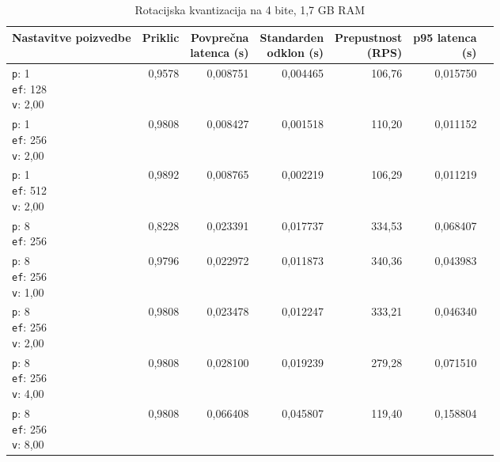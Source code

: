 \begin{table}[htbp]
  \centering
\small
  \caption{Rotacijska kvantizacija na 4 bite, 1,7 GB RAM}
  \label{tab:single-2cpu-1.7ram:tq4:qdrant-dipl-baseline-tenant-subgraph-tq4-ext-m16-ef-128-random-768-100-tenants-extended-upload-2026-08-18-13-03-21.json}
  \begin{tabularx}{\textwidth}{Xrrrrrr}
    \toprule
    Nastavitve poizvedbe & Priklic & \makecell{Povprečna\\latenca (s)} & \makecell{Standarden\\odklon (s)} & \makecell{Prepustnost\\(RPS)} & \makecell{p95 latenca\\(s)}  \\
    \midrule
    \makecell{\texttt{p}: 1\\\texttt{ef}: 128\\\texttt{v}: 2,00} & 0,9578 & 0,008751 & 0,004465 & 106,76 & 0,015750 \\
    \makecell{\texttt{p}: 1\\\texttt{ef}: 256\\\texttt{v}: 2,00} & 0,9808 & 0,008427 & 0,001518 & 110,20 & 0,011152 \\
    \makecell{\texttt{p}: 1\\\texttt{ef}: 512\\\texttt{v}: 2,00} & 0,9892 & 0,008765 & 0,002219 & 106,29 & 0,011219 \\
    \makecell{\texttt{p}: 8\\\texttt{ef}: 256} & 0,8228 & 0,023391 & 0,017737 & 334,53 & 0,068407 \\
    \makecell{\texttt{p}: 8\\\texttt{ef}: 256\\\texttt{v}: 1,00} & 0,9796 & 0,022972 & 0,011873 & 340,36 & 0,043983 \\
    \makecell{\texttt{p}: 8\\\texttt{ef}: 256\\\texttt{v}: 2,00} & 0,9808 & 0,023478 & 0,012247 & 333,21 & 0,046340 \\
    \makecell{\texttt{p}: 8\\\texttt{ef}: 256\\\texttt{v}: 4,00} & 0,9808 & 0,028100 & 0,019239 & 279,28 & 0,071510 \\
    \makecell{\texttt{p}: 8\\\texttt{ef}: 256\\\texttt{v}: 8,00} & 0,9808 & 0,066408 & 0,045807 & 119,40 & 0,158804 \\

\end{tabularx}
\end{table}
